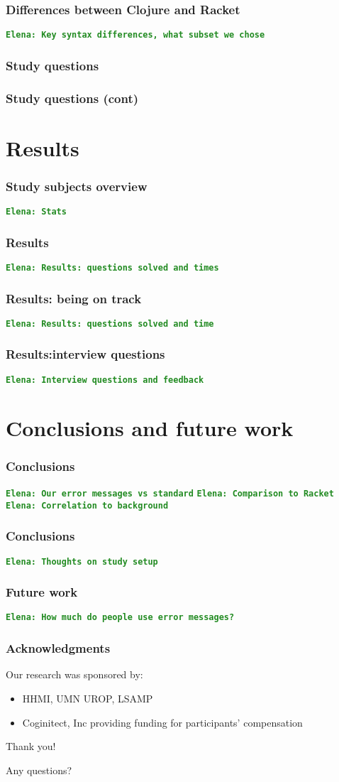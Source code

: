 \documentclass{beamer}
\newcommand{\comment}[1]{{\bf \tt  {#1}}}
\newcommand{\emcomment}[1]{\textcolor{ForestGreen}{\comment{Elena: {#1}}}}
\begin{document}
\begin{frame}
\frametitle{ Differences between Clojure and Racket}
\emcomment{Key syntax differences, what subset we chose}
\end{frame}

\begin{frame}
\frametitle{Study questions}

\end{frame}

\begin{frame}
\frametitle{Study questions (cont)}

\end{frame}

\section{Results}

\begin{frame}
\frametitle{Study subjects overview}
\emcomment{Stats}
\end{frame}

\begin{frame}
\frametitle{Results}
\emcomment{Results: questions solved and times}
\end{frame}

\begin{frame}
\frametitle{Results: being on track}
\emcomment{Results: questions solved and time}
\end{frame}

\begin{frame}
\frametitle{Results:interview questions}
\emcomment{Interview questions and feedback}
\end{frame}

\section{Conclusions and future work}

\frametitle{Conclusions}
\begin{frame}
\emcomment{Our error messages vs standard}
\emcomment{Comparison to Racket}
\emcomment{Correlation to background}
\end{frame}

\begin{frame}
\frametitle{Conclusions}
\emcomment{Thoughts on study setup}
\end{frame}

\begin{frame}
\frametitle{Future work}
\emcomment{How much do people use error messages?}
\end{frame}

\begin{frame}
\frametitle{Acknowledgments}
	Our research was sponsored by:
	\begin{itemize}
	\item HHMI, UMN UROP, LSAMP
        \item Coginitect, Inc providing funding for participants' compensation 
	\end{itemize}
	{\centering
	\noindent
	Thank you! \par
	Any questions? \par
	}
\end{frame}
\end{document}
